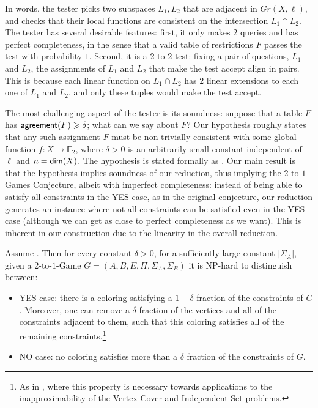 \documentclass{toc}
\newcommand*\dimm{{\sf dim}}
\renewcommand\geq{\geqslant}
\def\F{\mathbb{F}}
\def\agr{{\sf agreement}}
\begin{document}
In words, the tester picks two subspaces $L_1,L_2$ that are adjacent in $Gr(X,\ell)$, and checks that their local functions are consistent
on the intersection $L_1\cap L_2$. The tester has several desirable features: first, it only makes $2$ queries and has perfect
completeness, in the sense that a valid table of restrictions $F$ passes the test with probability $1$. Second, it is a $2$-to-$2$
test: fixing a pair of questions,  %
$L_1$ and $L_2$, the assignments of $L_1$ and $L_2$ that make the test accept align in pairs. This is
because each linear function on $L_1\cap L_2$ has $2$ linear extensions to each one of $L_1$ and $L_2$, and only these tuples would make
the test accept.

The most challenging aspect of the tester is its soundness: suppose that a table $F$ has $\agr(F)\geq \delta$; what can we
say about $F$? Our hypothesis roughly states that any such assignment $F$ must be non-trivially consistent with some global
function $f:X\to\F_2$, where $\delta>0$ is an arbitrarily small
constant independent of $\ell$ and $n=\dimm(X)$.  The hypothesis is
stated formally as . Our main result is that
the hypothesis implies soundness of our reduction, thus implying the
$2$-to-$1$ Games Conjecture, albeit with imperfect completeness:
instead of being able to satisfy all constraints in the YES case, as
in the original conjecture, our reduction generates an instance where
not all constraints can be satisfied even in the YES case (although we
can get as close to perfect completeness as we want). This
is inherent in our construction due to the linearity in the overall reduction.

\begin{theorem} \label{thm:main-result}
Assume . Then for every constant $\delta>0$, for a sufficiently large constant  $|\Sigma_A|$,
given a $2$-to-$1$-Game $G=(A,B,E,\Pi,\Sigma_A,\Sigma_B)$ it is NP-hard to distinguish between:
\begin{itemize}
\item YES case: there is a coloring satisfying
a %
$1-\delta$ fraction of the
  constraints of $G$. Moreover, one can remove a $\delta$ fraction of the
  vertices and all of the constraints adjacent to them, such that this coloring
  satisfies all of the remaining constraints.\footnote{As in \cite{KMS}, where this property is necessary towards applications to the inapproximability of the Vertex Cover and Independent Set problems. }

\item NO case: no coloring satisfies more than
a %
$\delta$ fraction of the constraints of $G$.
\end{itemize}
\end{theorem}
\end{document}
